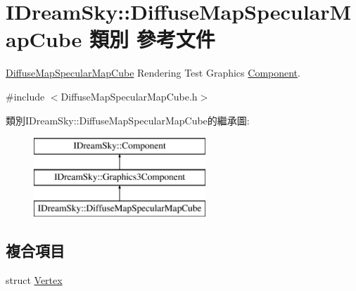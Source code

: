 \hypertarget{class_i_dream_sky_1_1_diffuse_map_specular_map_cube}{}\section{I\+Dream\+Sky\+:\+:Diffuse\+Map\+Specular\+Map\+Cube 類別 參考文件}
\label{class_i_dream_sky_1_1_diffuse_map_specular_map_cube}


\hyperlink{class_i_dream_sky_1_1_diffuse_map_specular_map_cube}{Diffuse\+Map\+Specular\+Map\+Cube} Rendering Test Graphics \hyperlink{class_i_dream_sky_1_1_component}{Component}.  




{\ttfamily \#include $<$Diffuse\+Map\+Specular\+Map\+Cube.\+h$>$}

類別\+I\+Dream\+Sky\+:\+:Diffuse\+Map\+Specular\+Map\+Cube的繼承圖\+:\begin{figure}[H]
\begin{center}
\leavevmode
\includegraphics[height=3.000000cm]{class_i_dream_sky_1_1_diffuse_map_specular_map_cube}
\end{center}
\end{figure}
\subsection*{複合項目}
\begin{DoxyCompactItemize}
\item 
struct \hyperlink{struct_i_dream_sky_1_1_diffuse_map_specular_map_cube_1_1_vertex}{Vertex}
\end{DoxyCompactItemize}
